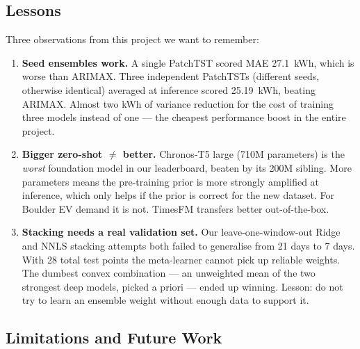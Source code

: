 \subsection{Lessons}

Three observations from this project we want to remember:
\begin{enumerate}[leftmargin=*]
    \item \textbf{Seed ensembles work.} A single PatchTST scored
    MAE 27.1~kWh, which is worse than ARIMAX. Three independent
    PatchTSTs (different seeds, otherwise identical) averaged at
    inference scored 25.19~kWh, beating ARIMAX. Almost two kWh of
    variance reduction for the cost of training three models instead
    of one --- the cheapest performance boost in the entire project.
    \item \textbf{Bigger zero-shot $\neq$ better.} Chronos-T5 large
    (710M parameters) is the \emph{worst} foundation model in our
    leaderboard, beaten by its 200M sibling. More parameters means
    the pre-training prior is more strongly amplified at inference,
    which only helps if the prior is correct for the new dataset.
    For Boulder EV demand it is not. TimesFM transfers better
    out-of-the-box.
    \item \textbf{Stacking needs a real validation set.} Our
    leave-one-window-out Ridge and NNLS stacking attempts both failed
    to generalise from 21 days to 7 days. With 28 total test points
    the meta-learner cannot pick up reliable weights. The dumbest
    convex combination --- an unweighted mean of the two strongest
    deep models, picked a priori --- ended up winning. Lesson: do not
    try to learn an ensemble weight without enough data to support
    it.
\end{enumerate}

\subsection{Limitations and Future Work}

